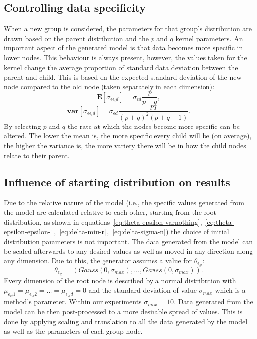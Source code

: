 \documentclass{article}
\begin{document}
	\subsection{Controlling data specificity}
	When a new group is considered, the parameters for that group's distribution are drawn based on the parent distribution and the $p$ and $q$ kernel parameters. An important aspect of the generated model is that data becomes more specific in lower nodes. This behaviour is always present, however, the values taken for the kernel change the average proportion 
    of standard data deviation between the parent and child.
    This is based on the expected standard deviation of the new node compared to the old node (taken separately in each dimension):
	\begin{equation}\label{eq:analitical_expected_standard_dev}
	\mathbf{E}[\sigma_{\epsilon\epsilon_id}] = \sigma_{\epsilon d} \frac{p}{p + q},
	\end{equation}
	\begin{equation}\label{eq:analitical_variance_standard_dev}
	\mathbf{var}[\sigma_{\epsilon\epsilon_id}] = \sigma_{\epsilon d} \frac{pq}{(p + q)^2(p + q + 1)}.
	\end{equation}
	By selecting $p$ and $q$ the rate at which the nodes become more specific can be altered. The lower the mean is, the more specific every child will be (on average), the higher the variance is, the more variety there will be in how the child nodes relate to their parent.
	\subsection{Influence of starting distribution on results}
	Due to the relative nature of the model (i.e., the specific values generated from the model are calculated relative to each other, starting from the root distribution, as shown in equations~\ref{eq:theta-epsilon-varnothing},~\ref{eq:theta-epsilon-epsilon-i},~\ref{eq:delta-miu-n},~\ref{eq:delta-sigma-n}) the choice of initial distribution parameters is not important. The data generated from the model can be scaled afterwards to any desired values as well as moved in any direction along any dimension. Due to this, the generator assumes a value for $\theta_{\epsilon_\varnothing}$:
    \begin{equation}
	\theta_{\epsilon_\varnothing} = (Gauss(0,\sigma_{max}), ..., Gauss(0,\sigma_{max})).
	\end{equation}
	Every dimension of the root node is described by a normal distribution with $\mu_{{\epsilon_\varnothing} 1} = \mu_{{\epsilon_\varnothing} 2} = ... = \mu_{{\epsilon_\varnothing} d} = 0$ and the standard deviation of value $\sigma_{max}$ which is a method's parameter. Within our experiments $\sigma_{max} = 10$. Data generated from the model can be then post-processed to a more desirable spread of values. This is done by applying scaling and translation to all the data generated by the model as well as the parameters of each group node.
\end{document}
